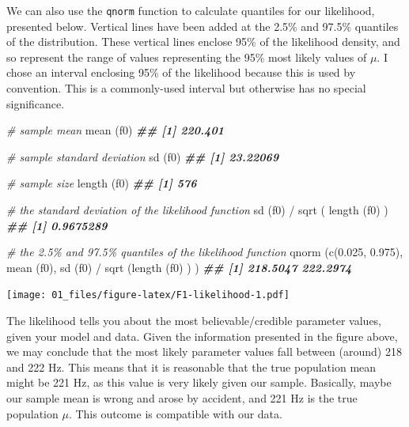 \documentclass[
]{book}
\newenvironment{Shaded}{\begin{snugshade}}{\end{snugshade}}
\newcommand{\CommentTok}[1]{\textcolor[rgb]{0.56,0.35,0.01}{\textit{#1}}}
\newcommand{\DocumentationTok}[1]{\textcolor[rgb]{0.56,0.35,0.01}{\textbf{\textit{#1}}}}
\newcommand{\FloatTok}[1]{\textcolor[rgb]{0.00,0.00,0.81}{#1}}
\newcommand{\FunctionTok}[1]{\textcolor[rgb]{0.00,0.00,0.00}{#1}}
\newcommand{\NormalTok}[1]{#1}
\newcommand{\SpecialCharTok}[1]{\textcolor[rgb]{0.00,0.00,0.00}{#1}}
\begin{document}
We can also use the \texttt{qnorm} function to calculate quantiles for our likelihood, presented below. Vertical lines have been added at the 2.5\% and 97.5\% quantiles of the distribution. These vertical lines enclose 95\% of the likelihood density, and so represent the range of values representing the 95\% most likely values of \(\mu\). I chose an interval enclosing 95\% of the likelihood because this is used by convention. This is a commonly-used interval but otherwise has no special significance.

\begin{Shaded}
\begin{Highlighting}[]
\CommentTok{\# sample mean}
\FunctionTok{mean}\NormalTok{ (f0)   }
\DocumentationTok{\#\# [1] 220.401}

\CommentTok{\# sample standard deviation}
\FunctionTok{sd}\NormalTok{ (f0)     }
\DocumentationTok{\#\# [1] 23.22069}

\CommentTok{\# sample size}
\FunctionTok{length}\NormalTok{ (f0)  }
\DocumentationTok{\#\# [1] 576}

\CommentTok{\# the standard deviation of the likelihood function}
\FunctionTok{sd}\NormalTok{ (f0) }\SpecialCharTok{/} \FunctionTok{sqrt}\NormalTok{ ( }\FunctionTok{length}\NormalTok{ (f0) ) }
\DocumentationTok{\#\# [1] 0.9675289}

\CommentTok{\# the 2.5\% and 97.5\% quantiles of the likelihood function}
\FunctionTok{qnorm}\NormalTok{ (}\FunctionTok{c}\NormalTok{(}\FloatTok{0.025}\NormalTok{, }\FloatTok{0.975}\NormalTok{), }\FunctionTok{mean}\NormalTok{ (f0), }\FunctionTok{sd}\NormalTok{ (f0) }\SpecialCharTok{/} \FunctionTok{sqrt}\NormalTok{ (}\FunctionTok{length}\NormalTok{ (f0) ) )}
\DocumentationTok{\#\# [1] 218.5047 222.2974}
\end{Highlighting}
\end{Shaded}

\texttt{[image: 01\_files/figure-latex/F1-likelihood-1.pdf]}
~

The likelihood tells you about the most believable/credible parameter values, given your model and data. Given the information presented in the figure above, we may conclude that the most likely parameter values fall between (around) 218 and 222 Hz. This means that it is reasonable that the true population mean might be 221 Hz, as this value is very likely given our sample. Basically, maybe our sample mean is wrong and arose by accident, and 221 Hz is the true population \(\mu\). This outcome is compatible with our data.
\end{document}
